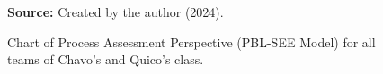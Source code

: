 \begin{figure}[ht!]
\centering

\caption{\textmd{Chart of Process Assessment Perspective (\acrshort{PBL-SEE} Model) for all teams of Chavo's and Quico's class.}}
\label{fig:pbl-see_process}

\par\medskip\ABNTEXfontereduzida\selectfont\textbf{Source:} Created by the author (2024).
\end{figure}